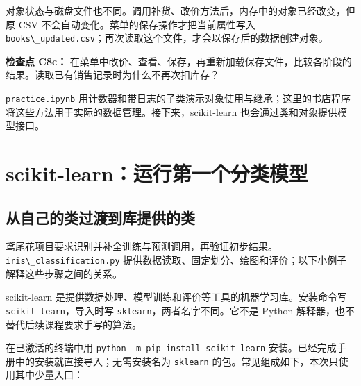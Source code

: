 \documentclass[UTF8,a4paper,11pt,fontset=fandol]{ctexart}
\providecommand{\passthrough}[1]{#1}
\begin{document}
对象状态与磁盘文件也不同。调用补货、改价方法后，内存中的对象已经改变，但原 CSV 不会自动变化。菜单的保存操作才把当前属性写入 \passthrough{\lstinline!books\_updated.csv!}；再次读取这个文件，才会以保存后的数据创建对象。

\textbf{检查点 C8c：} 在菜单中改价、查看、保存，再重新加载保存文件，比较各阶段的结果。读取已有销售记录时为什么不再次扣库存？

\passthrough{\lstinline!practice.ipynb!} 用计数器和带日志的子类演示对象使用与继承；这里的书店程序将这些方法用于实际的数据管理。接下来，scikit-learn 也会通过类和对象提供模型接口。

\clearpage

\section{scikit-learn：运行第一个分类模型}\label{scikit-learnux8fd0ux884cux7b2cux4e00ux4e2aux5206ux7c7bux6a21ux578b}

\subsection{从自己的类过渡到库提供的类}\label{ux4eceux81eaux5df1ux7684ux7c7bux8fc7ux6e21ux5230ux5e93ux63d0ux4f9bux7684ux7c7b}

鸢尾花项目要求识别并补全训练与预测调用，再验证初步结果。\passthrough{\lstinline!iris\_classification.py!} 提供数据读取、固定划分、绘图和评价；以下小例子解释这些步骤之间的关系。

scikit-learn 是提供数据处理、模型训练和评价等工具的机器学习库。安装命令写 \passthrough{\lstinline!scikit-learn!}，导入时写 \passthrough{\lstinline!sklearn!}，两者名字不同。它不是 Python 解释器，也不替代后续课程要求手写的算法。

在已激活的终端中用 \passthrough{\lstinline!python -m pip install scikit-learn!} 安装。已经完成手册中的安装就直接导入；无需安装名为 \passthrough{\lstinline!sklearn!} 的包。常见组成如下，本次只使用其中少量入口：
\end{document}
